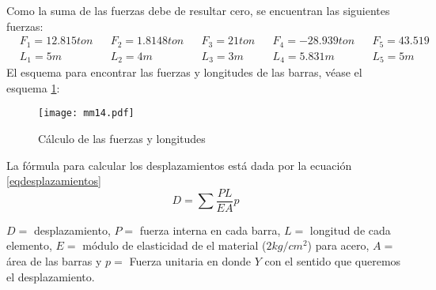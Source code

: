 Como la suma de las fuerzas debe de resultar cero, se encuentran las siguientes fuerzas:
\begin{align*}
  &F_1 =12.815ton&&F_2 = 1.8148ton&&F_3 = 21ton && F_4 = -28.939 ton&&F_5 =43.519\\
  &L_1 = 5m&&L_2 = 4m&&L_3 = 3m&&L_4 = 5.831m&&L_5 = 5m 
\end{align*}
El esquema para encontrar las fuerzas y longitudes de las barras, véase el esquema \ref{mm14}:

\begin{figure}[h!]
\centering
\texttt{[image: mm14.pdf]}
\caption{Cálculo de las fuerzas y longitudes}
\label{mm14}
\end{figure}

La fórmula para calcular los desplazamientos está dada por la ecuación \eqref{eqdesplazamientos}
\begin{equation}
  D =\sum \frac{PL}{EA} p
  \label{eqdesplazamientos}
\end{equation}

$D=$ desplazamiento, $P=$ fuerza interna en cada barra, $L=$ longitud de cada elemento, $E=$ módulo de elasticidad de el material ($2kg/cm^2$) para acero, $A=$ área de las barras y $p=$ Fuerza unitaria en donde $Y$ con el sentido que queremos el desplazamiento.

